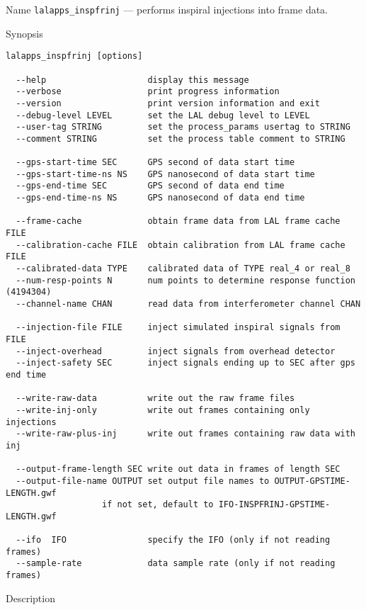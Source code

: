 \begin{entry}
\item[Name]
\verb$lalapps_inspfrinj$ --- performs inspiral injections into frame data.

\item[Synopsis]
\begin{verbatim}
lalapps_inspfrinj [options]
 
  --help                    display this message
  --verbose                 print progress information
  --version                 print version information and exit
  --debug-level LEVEL       set the LAL debug level to LEVEL
  --user-tag STRING         set the process_params usertag to STRING
  --comment STRING          set the process table comment to STRING
 
  --gps-start-time SEC      GPS second of data start time
  --gps-start-time-ns NS    GPS nanosecond of data start time
  --gps-end-time SEC        GPS second of data end time
  --gps-end-time-ns NS      GPS nanosecond of data end time
 
  --frame-cache             obtain frame data from LAL frame cache FILE
  --calibration-cache FILE  obtain calibration from LAL frame cache FILE
  --calibrated-data TYPE    calibrated data of TYPE real_4 or real_8
  --num-resp-points N       num points to determine response function (4194304)
  --channel-name CHAN       read data from interferometer channel CHAN
 
  --injection-file FILE     inject simulated inspiral signals from FILE
  --inject-overhead         inject signals from overhead detector
  --inject-safety SEC       inject signals ending up to SEC after gps end time
 
  --write-raw-data          write out the raw frame files
  --write-inj-only          write out frames containing only injections
  --write-raw-plus-inj      write out frames containing raw data with inj
 
  --output-frame-length SEC write out data in frames of length SEC
  --output-file-name OUTPUT set output file names to OUTPUT-GPSTIME-LENGTH.gwf
                   if not set, default to IFO-INSPFRINJ-GPSTIME-LENGTH.gwf
 
  --ifo  IFO                specify the IFO (only if not reading frames)
  --sample-rate             data sample rate (only if not reading frames)
\end{verbatim}

\item[Description] 


\end{entry}
